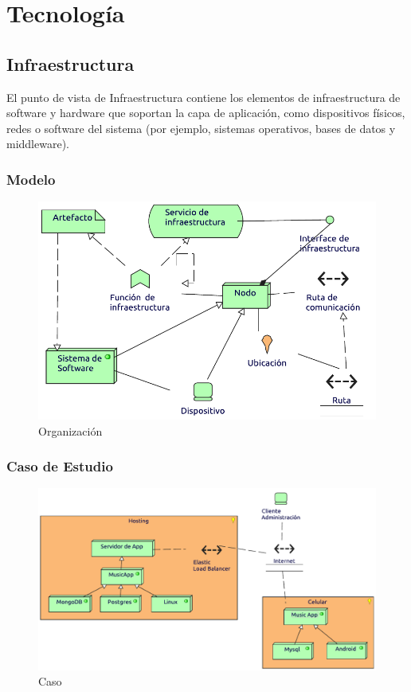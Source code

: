 \chapter{Tecnología}

\section{Infraestructura}
El punto de vista de Infraestructura contiene los elementos de infraestructura de software y hardware que soportan la capa de aplicación, como dispositivos físicos, redes o software del sistema (por ejemplo, sistemas operativos, bases de datos y middleware).
\subsection{Modelo}
\begin{figure}[h!]
	\centering
	\includegraphics[width=0.8\linewidth]{Arquitectura/Tecnologia/imgs/insfraestructuraMetamodelo.pdf}
	\caption{Organización}
\end{figure}
\newpage
\subsection{Caso de Estudio}

\begin{figure}[h!]
	\centering
	\includegraphics[width=\linewidth]{Arquitectura/Tecnologia/imgs/insfraestructura.pdf}
	\caption{Caso}
\end{figure}

